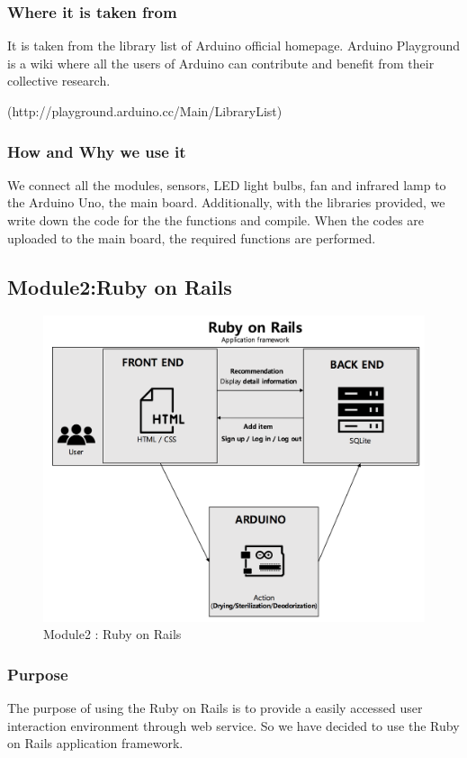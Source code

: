 \documentclass[conference]{IEEEtran}
\begin{document}
\subsubsection{Where it is taken from} It is taken from the library list of Arduino official homepage. Arduino Playground is a wiki where all the users of Arduino can contribute and benefit from their collective research.

(http://playground.arduino.cc/Main/LibraryList)
\subsubsection{How and Why we use it}We connect all the modules, sensors, LED light bulbs, fan and infrared lamp to the Arduino Uno, the main board. Additionally, with the libraries provided, we write down the code for the the functions and compile. When the codes are uploaded to the main board, the required functions are performed.

\subsection{Module2:Ruby on Rails}
\begin{figure}[h]
\begin{center}
    \includegraphics[scale=0.33]{module2}
    \caption{Module2 : Ruby on Rails} \label{fig:label}
\end{center}
\end{figure}

\subsubsection{Purpose} The purpose of using the Ruby on Rails is to provide a easily accessed user interaction environment through web service. So we have decided to use the Ruby on Rails application framework.
\end{document}
